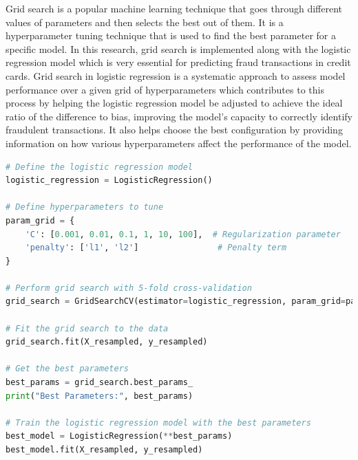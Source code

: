 Grid search is a popular machine learning technique that goes through different values of parameters and then selects the best out of them. It is a hyperparameter tuning technique that is used to find the best parameter for a specific model. In this research, grid search is implemented along with the logistic regression model which is very essential for predicting fraud transactions in credit cards. Grid search in logistic regression is a systematic approach to assess model performance over a given grid of hyperparameters which contributes to this process by helping the logistic regression model be adjusted to achieve the ideal ratio of the difference to bias, improving the model's capacity to correctly identify fraudulent transactions. It also helps choose the best configuration by providing information on how various hyperparameters affect the performance of the model. 

\begin{lstlisting}[language=Python, caption={Training the model using Grid Search}, label=list:python_code_ex]
# Define the logistic regression model
logistic_regression = LogisticRegression()

# Define hyperparameters to tune
param_grid = {
    'C': [0.001, 0.01, 0.1, 1, 10, 100],  # Regularization parameter
    'penalty': ['l1', 'l2']                # Penalty term
}

# Perform grid search with 5-fold cross-validation
grid_search = GridSearchCV(estimator=logistic_regression, param_grid=param_grid, cv=5, scoring='f1_macro', verbose=1)

# Fit the grid search to the data
grid_search.fit(X_resampled, y_resampled)

# Get the best parameters
best_params = grid_search.best_params_
print("Best Parameters:", best_params)

# Train the logistic regression model with the best parameters
best_model = LogisticRegression(**best_params)
best_model.fit(X_resampled, y_resampled)
\end{lstlisting}

